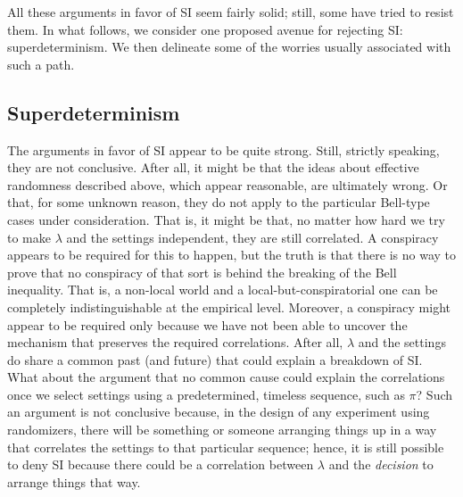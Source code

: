 \documentclass[letterpaper,12pt]{article}
\begin{document}
All these arguments in favor of SI seem fairly solid; still, some have tried to resist them. In what follows, we consider one proposed avenue for rejecting SI: superdeterminism. We then delineate some of the worries usually associated with such a path.

\subsection{Superdeterminism}
\label{RSI}

The arguments in favor of SI appear to be quite strong. Still, strictly speaking, they are not conclusive. After all, it might be that the ideas about effective randomness described above, which appear reasonable, are ultimately wrong. Or that, for some unknown reason, they do not apply to the particular Bell-type cases under consideration. That is, it might be that, no matter how hard we try to make $\lambda$ and the settings independent, they are still correlated. A conspiracy appears to be required for this to happen, but the truth is that there is no way to prove that no conspiracy of that sort is behind the breaking of the Bell inequality. That is, a non-local world and a local-but-conspiratorial one can be completely indistinguishable at the empirical level. Moreover, a conspiracy might appear to be required only because we have not been able to uncover the mechanism that preserves the required correlations. After all, $\lambda$ and the settings do share a common past (and future) that could explain a breakdown of SI. What about the argument that no common cause could explain the correlations once we select settings using a predetermined, timeless sequence, such as $\pi$? Such an argument is not conclusive because, in the design of any experiment using randomizers, there will be something or someone arranging things up in a way that correlates the settings to that particular sequence; hence, it is still possible to deny SI because there could be a correlation between $\lambda$ and the {\it decision} to arrange things that way.
\end{document}
